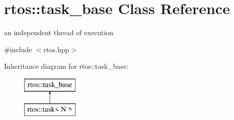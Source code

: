 \hypertarget{classrtos_1_1task__base}{}\section{rtos\+:\+:task\+\_\+base Class Reference}
\label{classrtos_1_1task__base}


an independent thread of execution  




{\ttfamily \#include $<$rtos.\+hpp$>$}

Inheritance diagram for rtos\+:\+:task\+\_\+base\+:\begin{figure}[H]
\begin{center}
\leavevmode
\includegraphics[height=2.000000cm]{classrtos_1_1task__base}
\end{center}
\end{figure}
